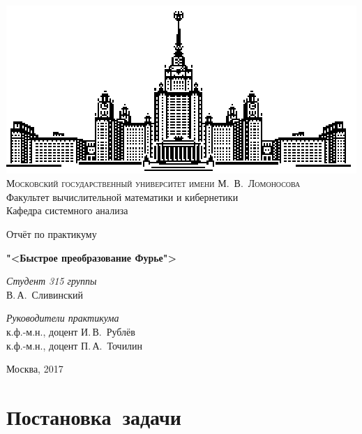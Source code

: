 \documentclass[11pt, oneside, final]{article} \sloppy
\numberwithin{equation}{section}
\begin{document}
\thispagestyle{empty}
\begin{center}
    \ \vspace{-3cm}
    
    \includegraphics[width=0.5
    \textwidth]{msu}\\
    {\scshape Московский государственный университет имени М.~В.~Ломоносова}\\
    Факультет вычислительной математики и кибернетики\\
    Кафедра системного анализа
    
    \vfill
    
    {\LARGE Отчёт по практикуму}
    
    \vspace{1cm}
    
    {\Huge\bfseries "<Быстрое преобразование Фурье">} 
\end{center}

\vspace{1cm}
\begin{flushright}
    \large \textit{Студент 315 группы}\\
    В.\,А.~Сливинский
    
    \vspace{5mm}
    
    \textit{Руководители практикума}\\
    к.ф.-м.н., доцент И.\,В.~Рублёв \\
    к.ф.-м.н., доцент П.\,А.~Точилин 
\end{flushright}

\vfill
\begin{center}
    Москва, 2017 
\end{center}
\pagebreak

\tableofcontents

\pagebreak



\section{Постановка~задачи}
\end{document}
